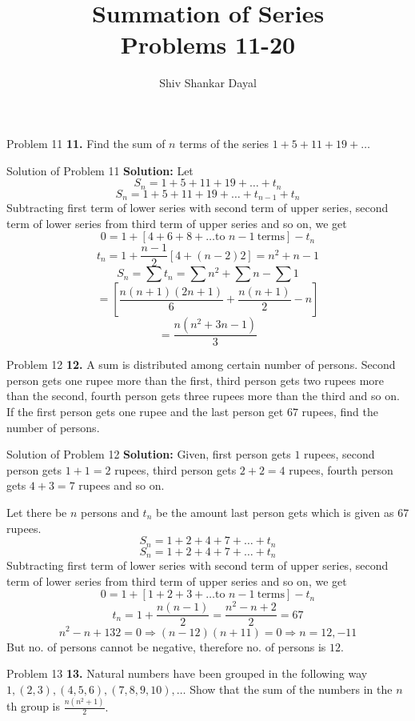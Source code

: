\documentclass[aspectratio=1610,8pt]{beamer}
\title{Summation of Series\\Problems 11-20}
\author[Shiv Shankar Dayal]{Shiv Shankar Dayal}
\begin{document}
\begin{frame}
  \titlepage
\end{frame}
\begin{frame}{Problem 11}
  \textbf{11.} Find the sum of $n$ terms of the series $1 + 5 + 11 + 19 + \ldots$
\end{frame}
\begin{frame}{Solution of Problem 11}
  \textbf{Solution:} Let
  $$S_n = 1 + 5 + 11 + 19 + \ldots + t_n$$
  $$S_n = 1 + 5 + 11 + 19 + \ldots + t_{n -1} + t_n$$
  Subtracting first term of lower series with second term of upper series, second term of lower series from third term of upper
  series and so on, we get
  $$0 = 1 + [4 + 6 + 8 + \ldots \text{to~}n - 1~\text{terms}] - t_n$$
  $$t_n = 1 + \frac{n - 1}{2}[4 + (n - 2)2] = n^2 + n - 1$$
  $$S_n = \sum t_n = \sum n^2 + \sum n - \sum 1$$
  $$= \left[\frac{n(n + 1)(2n + 1)}{6} + \frac{n(n + 1)}{2} - n\right]$$
  $$= \frac{n(n^2 + 3n - 1)}{3}$$
\end{frame}
\begin{frame}{Problem 12}
  \textbf{12.} A sum is distributed among certain number of persons. Second person gets one rupee more than the first, third person
  gets two rupees more than the second, fourth person gets three rupees more than the third and so on. If the first person gets one
  rupee and the last person get $67$ rupees, find the number of persons.
\end{frame}
\begin{frame}{Solution of Problem 12}
  \textbf{Solution:} Given, first person gets $1$ rupees, second person gets $1 + 1 = 2$ rupees, third person gets $2 + 2 = 4$
  rupees, fourth person gets $4 + 3 = 7$ rupees and so on.

  Let there be $n$ persons and $t_n$ be the amount last person gets which is given as $67$ rupees.
  $$S_n = 1 + 2 + 4 + 7 + \ldots + t_n$$
  $$S_n = 1 + 2 + 4 + 7 + \ldots + t_n$$
  Subtracting first term of lower series with second term of upper series, second term of lower series from third term of upper
  series and so on, we get
  $$0 = 1 + [1 + 2 + 3 + \ldots \text{to~}n - 1~\text{terms}] - t_n$$
  $$t_n = 1 + \frac{n(n - 1)}{2} = \frac{n^2 - n + 2}{2} = 67$$
  $$n^2 - n + 132 = 0 \Rightarrow (n - 12)(n + 11) = 0\Rightarrow n = 12, -11$$
  But no. of persons cannot be negative, therefore no. of persons is $12.$
\end{frame}
\begin{frame}{Problem 13}
  \textbf{13.} Natural numbers have been grouped in the following way $1, (2, 3), (4, 5, 6), (7, 8, 9, 10), \ldots$ Show that the
  sum of the numbers in the $n$th group is $\frac{n(n^2 + 1)}{2}.$
\end{frame}
\end{document}
